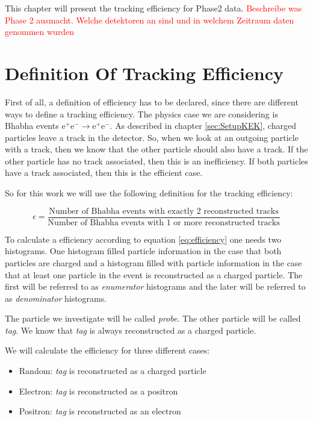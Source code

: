 \documentclass[a4paper,11pt,twosided,final,german,openbib,pdftex,listof=totoc,bibliography=totoc]{scrbook}
\begin{document}
This chapter will present the tracking efficiency for Phase2 data.  \textcolor{red}{Beschreibe was Phase 2 ausmacht. Welche detektoren an sind und in welchem Zeitraum daten genommen wurden}


\section{Definition Of Tracking Efficiency}
\label{sec:Eff}

First of all, a definition of efficiency has to be declared, since there are different ways to define a tracking efficiency. The physics case we are considering is Bhabha events $ \textrm{e}^+ \textrm{e}^- \rightarrow \textrm{e}^+ \textrm{e}^- $. As described in chapter \ref{sec:SetupKEK}, charged particles leave a track in the detector. So, when we look at an outgoing particle with a track, then we know that the other particle should also have a track. If the other particle has no track associated, then this is an inefficiency. If both particles have a track associated, then this is the efficient case.

So for this work we will use the following definition for the tracking efficiency:

\begin{equation}
	\epsilon = \frac{\textrm{Number of Bhabha events with exactly 2 reconstructed tracks}}{\textrm{Number of Bhabha events with 1 or more reconstructed tracks}}
	\label{eq:efficiency}
\end{equation}


To calculate a efficiency according to equation \ref{eq:efficiency} one needs two histograms. One histogram filled particle information in the case that both particles are charged and a histogram filled with particle information in the case that at least one particle in the event is reconstructed as a charged particle. The first will be referred to as \textit{enumerator} histograms and the later will be referred to as \textit{denominator} histograms.


The particle we investigate will be called \textit{probe}. The other particle will be called \textit{tag}. We  know that \textit{tag} is always reconstructed as a charged particle.

We will calculate the efficiency for three different cases:

\begin{itemize}
	\item Random: \textit{tag} is reconstructed as a charged particle
	\item Electron: \textit{tag} is reconstructed as a positron
	\item Positron: \textit{tag} is reconstructed as an electron
\end{itemize}
\end{document}
